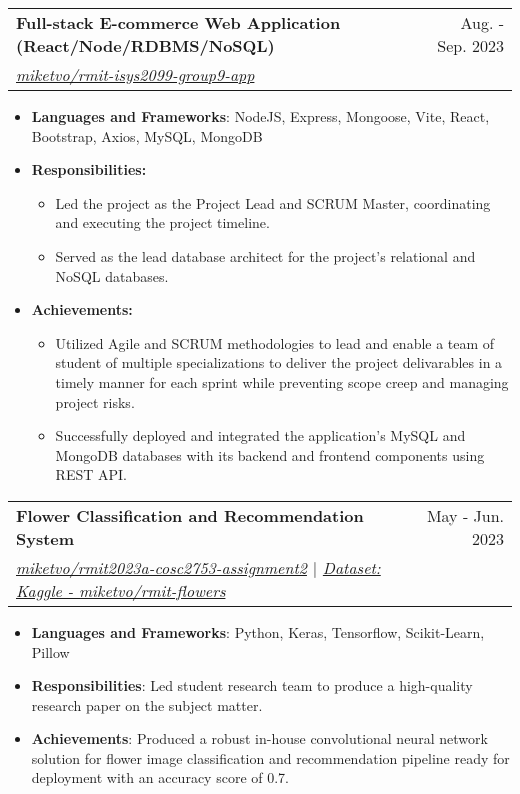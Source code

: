 \documentclass[a4paper,11pt]{article}
\makeatletter
\newcommand{\resumeItemHeading}[1]{\item\small{\textbf{#1:}}\vspace{-1.6pt}}
\newcommand{\resumeItemPlain}[1]{
  \setstretch{0.96}
  \item\small{
    {#1 \vspace{-1pt}}
  }
  \setstretch{1.0}
}
\newcommand{\resumeItem}[2]{
  \item\small{
    \textbf{#1}{: #2 \vspace{-2pt}}
  }
}
\newcommand{\resumeSubheading}[4]{
  \vspace{-2pt}\item
    \begin{tabular*}{0.97\textwidth}{l@{\extracolsep{\fill}}r}
      \textbf{#1} & #2 \\
      \textit{\small#3} & \textit{\small #4} \\
    \end{tabular*}\vspace{-5pt}
}
\newcommand{\resumeItemListStart}{\begin{itemize}[leftmargin=16pt]}
\newcommand{\resumeItemListEnd}{\end{itemize}\vspace{-2pt}}
\newcommand{\resumeSubItemListStart}{\begin{itemize}[leftmargin=*]}
\newcommand{\resumeSubItemListEnd}{\end{itemize}\vspace{-2pt}}
\makeatother
\begin{document}
    \resumeSubheading
      {Full-stack E-commerce Web Application (React/Node/RDBMS/NoSQL)}{Aug. - Sep. 2023}
      {\href{https://github.com/miketvo/rmit-isys2099-group9-app}{\faGithub\space miketvo/rmit-isys2099-group9-app}}{}
      \resumeItemListStart
        \resumeItem{Languages and Frameworks}
          {NodeJS, Express, Mongoose, Vite, React, Bootstrap, Axios, MySQL, MongoDB}
        \resumeItemHeading{Responsibilities}
          \resumeSubItemListStart
            \resumeItemPlain
              {Led the project as the Project Lead and SCRUM Master, coordinating and executing the project timeline.}
            \resumeItemPlain
              {Served as the lead database architect for the project's relational and NoSQL databases.}
          \resumeSubItemListEnd
        \resumeItemHeading{Achievements}
          \resumeSubItemListStart
            \resumeItemPlain
              {Utilized Agile and SCRUM methodologies to lead and enable a team of student of multiple specializations to deliver the project delivarables in a timely manner for each sprint while preventing scope creep and managing project risks.}
            \resumeItemPlain
              {Successfully deployed and integrated the application's MySQL and MongoDB databases with its backend and frontend components using REST API.}
          \resumeSubItemListEnd
      \resumeItemListEnd

    \resumeSubheading
      {Flower Classification and Recommendation System}{May - Jun. 2023}
      {\href{https://github.com/miketvo/rmit2023a-cosc2753-assignment2}{\faGithub\space miketvo/rmit2023a-cosc2753-assignment2} $|$ \href{https://www.kaggle.com/datasets/miketvo/rmit-flowers/}{\faDatabase\space Dataset: Kaggle - miketvo/rmit-flowers}}{}
      \resumeItemListStart
        \resumeItem{Languages and Frameworks}
          {Python, Keras, Tensorflow, Scikit-Learn, Pillow}
          \resumeItem{Responsibilities}
            {Led student research team to produce a high-quality research paper on the subject matter.}
          \resumeItem{Achievements}
            {Produced a robust in-house convolutional neural network solution for flower image classification and recommendation pipeline ready for deployment with an accuracy score of 0.7.}
      \resumeItemListEnd
\end{document}
